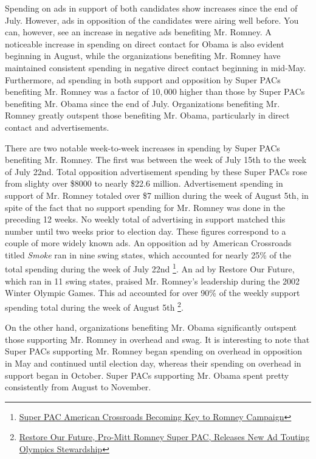 \documentclass[11pt]{article}\usepackage{graphicx, color}
\begin{document}
Spending on ads in support of both candidates show increases since the end of July. However, ads in opposition of the candidates were airing well before. You can, however, see an increase in negative ads benefiting Mr. Romney. A noticeable increase in spending on direct contact for Obama is also evident beginning in August, while the organizations benefiting Mr. Romney have maintained consistent spending in negative direct contact beginning in mid-May. Furthermore, ad spending in both support and opposition by Super PACs benefiting Mr. Romney was a factor of $10,000$ higher than those by Super PACs benefiting Mr. Obama since the end of July. Organizations benefiting Mr. Romney greatly outspent those benefiting Mr. Obama, particularly in direct contact and advertisements.

There are two notable week-to-week increases in spending by Super PACs benefiting Mr. Romney. The first was between the week of July 15th to the week of July 22nd. Total opposition advertisement spending by these Super PACs rose from slighty over \$8000 to nearly \$22.6 million. Advertisement spending in support of Mr. Romney totaled over \$7 million during the week of August 5th, in spite of the fact that no support spending for Mr. Romney was done in the preceding 12 weeks. No weekly total of advertising in support matched this number until two weeks prior to election day. These figures correspond to a couple of more widely known ads. An opposition ad by American Crossroads titled \textit{Smoke} ran in nine swing states, which accounted for nearly 25\% of the total spending during the week of July 22nd \footnote{\href{http://www.usnews.com/news/blogs/Ken-Walshs-Washington/2012/07/20/super-pac-american-crossroads-becoming-key-to-romney-campaign}{Super PAC American Crossroads Becoming Key to Romney Campaign}}. An ad by Restore Our Future, which ran in 11 swing states, praised Mr. Romney's leadership during the 2002 Winter Olympic Games. This ad accounted for over 90\% of the weekly support spending total during the week of August 5th \footnote{\href{http://www.huffingtonpost.com/2012/07/30/restore-our-future_n_1719310.html}{Restore Our Future, Pro-Mitt Romney Super PAC, Releases New Ad Touting Olympics Stewardship}}.

On the other hand, organizations benefiting Mr. Obama significantly outspent those supporting Mr. Romney in overhead and swag. It is interesting to note that Super PACs supporting Mr. Romney began spending on overhead in opposition in May and continued until election day, whereas their spending on overhead in support began in October. Super PACs supporting Mr. Obama spent pretty consistently from August to November.
\end{document}
